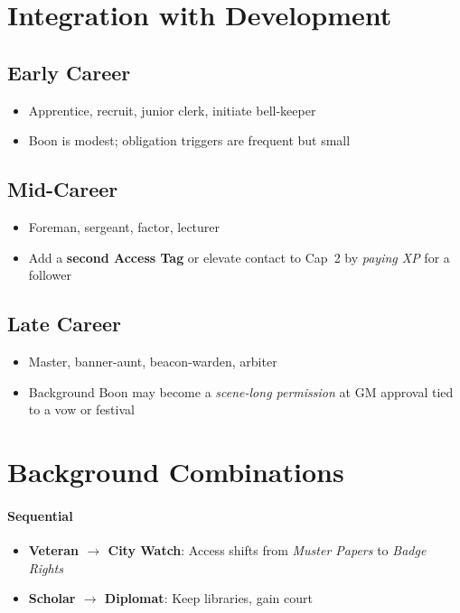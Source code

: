 \section{Integration with Development}

\subsection*{Early Career}
\begin{itemize}
\item Apprentice, recruit, junior clerk, initiate bell-keeper
\item Boon is modest; obligation triggers are frequent but small
\end{itemize}

\subsection*{Mid-Career}
\begin{itemize}
\item Foreman, sergeant, factor, lecturer
\item Add a \textbf{second Access Tag} or elevate contact to Cap~2 by \emph{paying XP} for a follower
\end{itemize}

\subsection*{Late Career}
\begin{itemize}
\item Master, banner-aunt, beacon-warden, arbiter
\item Background Boon may become a \emph{scene-long permission} at GM approval tied to a vow or festival
\end{itemize}

\section{Background Combinations}

\paragraph{Sequential}
\begin{itemize}
\item \textbf{Veteran $\rightarrow$ City Watch}: Access shifts from \textit{Muster Papers} to \textit{Badge Rights}
\item \textbf{Scholar $\rightarrow$ Diplomat}: Keep libraries, gain court
\end{itemize}

